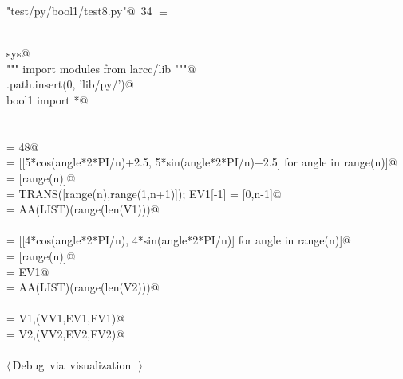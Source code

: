 \documentclass[11pt,oneside]{article}	%
\begin{document}
\begin{flushleft} \small \label{scrap42}
\protect{}\verb@"test/py/bool1/test8.py"@\nobreak\ {\footnotesize 34 }$\equiv$
\vspace{-1ex}
\begin{list}{}{} \item
\mbox{}\verb@@\\
\mbox{}\verb@import sys@\\
\mbox{}\verb@""" import modules from larcc/lib """@\\
\mbox{}\verb@sys.path.insert(0, 'lib/py/')@\\
\mbox{}\verb@from bool1 import *@\\
\mbox{}\verb@@\\
\mbox{}\verb@@\\
\mbox{}\verb@n = 48@\\
\mbox{} = [[5*cos(angle*2*PI/n)+2.5, 5*sin(angle*2*PI/n)+2.5] for angle in range(n)]@\\
\mbox{} = [range(n)]@\\
\mbox{} = TRANS([range(n),range(1,n+1)]); EV1[-1] = [0,n-1]@\\
\mbox{} = AA(LIST)(range(len(V1)))@\\
\mbox{}\verb@@\\
\mbox{} = [[4*cos(angle*2*PI/n), 4*sin(angle*2*PI/n)] for angle in range(n)]@\\
\mbox{} = [range(n)]@\\
\mbox{} = EV1@\\
\mbox{} = AA(LIST)(range(len(V2)))@\\
\mbox{}\verb@@\\
\mbox{} = V1,(VV1,EV1,FV1)@\\
\mbox{} = V2,(VV2,EV2,FV2)@\\
\mbox{}\verb@@\\
\mbox{}\verb@@\hbox{$\langle\,$Debug via visualization\nobreak\ {\footnotesize {}}$\,\rangle$}\verb@@\\
\mbox{}\verb@@{\NWsep}
\end{list}
\vspace{-2ex}
\end{flushleft}
\end{document}
